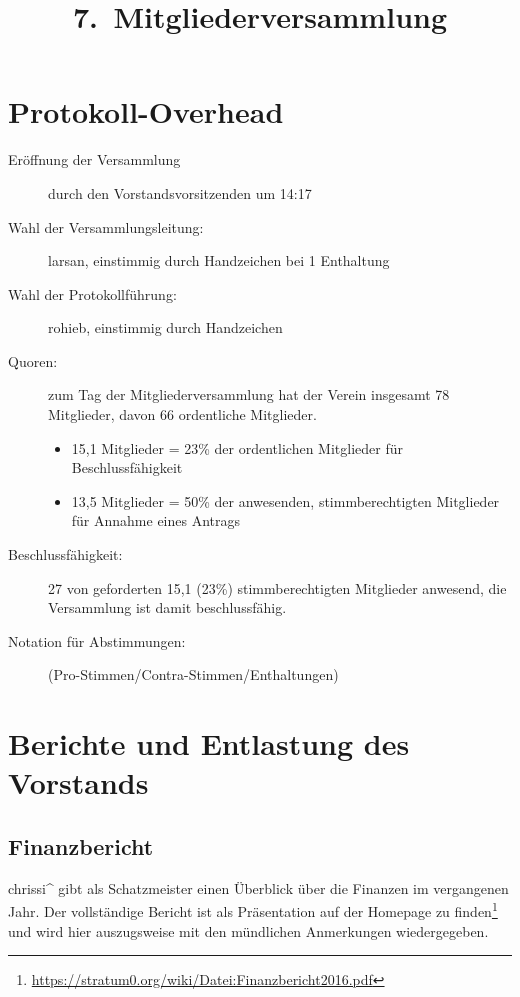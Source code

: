 \documentclass{s0minutes}
\title{7.\, Mitgliederversammlung}
\begin{document}
\maketitle

\section{Protokoll-Overhead}
\begin{description}
  \item[Eröffnung der Versammlung] durch den Vorstandsvorsitzenden um 14:17
  \item[Wahl der Versammlungsleitung:] larsan, einstimmig durch Handzeichen
    bei 1 Enthaltung
  \item[Wahl der Protokollführung:] rohieb, einstimmig durch Handzeichen
  \item[Quoren:] zum Tag der Mitgliederversammlung hat der Verein insgesamt 78
    Mitglieder, davon 66 ordentliche Mitglieder.
    \begin{itemize}
      \item 15{,}1 Mitglieder = 23\% der ordentlichen Mitglieder für
        Beschlussfähigkeit
      \item 13{,}5 Mitglieder = 50\% der anwesenden, stimmberechtigten Mitglieder
        für Annahme eines Antrags
    \end{itemize}
  \item[Beschlussfähigkeit:] 27 von geforderten 15{,}1 (23\%) stimmberechtigten
    Mitglieder anwesend, die Versammlung ist damit beschlussfähig.
  \item[Notation für Abstimmungen:] (Pro-Stimmen/Contra-Stimmen/Enthaltungen)
\end{description}

\section{Berichte und Entlastung des Vorstands}

\subsection{Finanzbericht}

chrissi\^{} gibt als Schatzmeister einen Überblick über die Finanzen im
vergangenen Jahr. Der vollständige Bericht ist als Präsentation auf der Homepage
zu finden\footnote{\url{https://stratum0.org/wiki/Datei:Finanzbericht2016.pdf}}
und wird hier auszugsweise mit den mündlichen Anmerkungen wiedergegeben.
\end{document}
